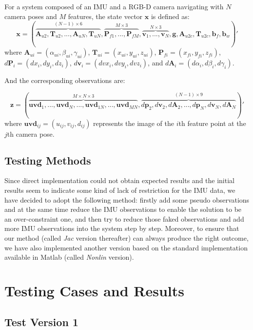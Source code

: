 \documentclass[12pt]{article}   %
\begin{document}
For a system composed of an IMU and a RGB-D camera navigating with $N$ camera poses and $M$ features, the state vector $\textbf{x}$ is defined as:
$$\textbf{x} = (\overbrace{\textbf{A}_{u2}, \textbf{T}_{u2}, ... , \textbf{A}_{uN}, \textbf{T}_{uN}}^{(N - 1) \times 6}, \overbrace{\textbf{P}_{f1}, ..., \textbf{P}_{fM}}^{M \times 3}, \overbrace{\textbf{v}_1, ..., \textbf{v}_{N}}^{N \times 3},  \textbf{g}, \textbf{A}_{u2c}, \textbf{T}_{u2c}, \textbf{b}_f, \textbf{b}_w)' $$
where
$\textbf{A}_{ui} = (\alpha_{ui}, \beta_{ui}, \gamma_{ui})$,
$\textbf{T}_{ui} = (x_{ui}, y_{ui}, z_{ui}) $,
$\textbf{P}_{fi} = (x_{fi}, y_{fi}, z_{fi}) $,
$d\textbf{P}_{i} = (dx_{i}, dy_{i}, dz_{i}) $,
$d\textbf{v}_{i} = (dvx_{i}, dvy_{i}, dvz_{i}) $, and
$d\textbf{A}_{i} = (d\alpha_{i}, d\beta_{i}, d\gamma_{i}) $.

And the corresponding observations are:

$$\textbf{z} = (\overbrace{\textbf{uvd}_{1}, ... , \textbf{uvd}_{N}, ..., \textbf{uvd}_{1N}, ... , \textbf{uvd}_{MN}}^{M \times N \times 3}, \overbrace{d\textbf{p}_2, d\textbf{v}_2, d\textbf{A}_2, ..., d\textbf{p}_N, d\textbf{v}_N, d\textbf{A}_N}^{(N - 1) \times 9})' $$
where $\textbf{uvd}_{ij} = (u_{ij}, v_{ij}, d_{ij})$ represents the image of the $i$th feature point  at the $j$th camera pose.

\subsection{Testing Methods}

Since direct implementation could not obtain expected results and the initial results seem to indicate some kind of lack of restriction for the IMU data, we have decided to adopt the following method: firstly add some pseudo observations and at the same time reduce the IMU observations to enable the solution to be an over-constraint one, and then try to reduce those faked observations and add more IMU observations into the system step by step. Moreover, to ensure that our method (called \textit{Jac} version thereafter) can always produce the right outcome, we have also implemented another version based on the standard implementation available in Matlab (called \textit{Nonlin} version).


\section{Testing Cases and Results}

\subsection{Test Version 1}
\end{document}
